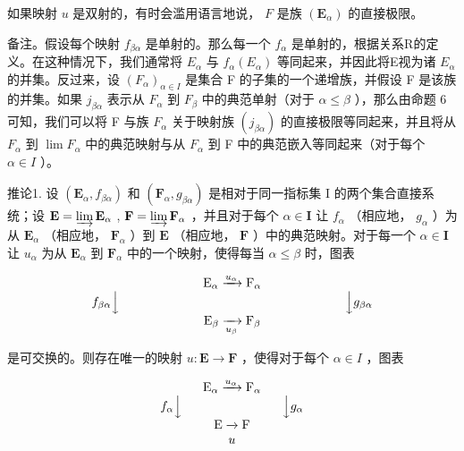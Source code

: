如果映射 \(u\) 是双射的，有时会滥用语言地说， \(F\) 是族 \((\mathbf{E}_{\alpha})\) 的直接极限。

备注。假设每个映射 \(f_{\beta \alpha}\) 是单射的。那么每一个 \(f_{\alpha}\) 是单射的，根据关系R的定义。在这种情况下，我们通常将 \(E_{\alpha}\) 与 \(f_{\alpha}(E_{\alpha})\) 等同起来，并因此将E视为诸 \(E_{\alpha}\) 的并集。反过来，设 \((F_{\alpha})_{\alpha \in I}\) 是集合 F 的子集的一个递增族，并假设 F 是该族的并集。如果 \(j_{\beta \alpha}\) 表示从 \(F_{\alpha}\) 到 \(F_{\beta}\) 中的典范单射（对于 \(\alpha \leqslant \beta\) ），那么由命题 6 可知，我们可以将 F 与族 \(F_{\alpha}\) 关于映射族 \((j_{\beta \alpha})\) 的直接极限等同起来，并且将从 \(F_{\alpha}\) 到 \(\lim F_{\alpha}\) 中的典范映射与从 \(F_{\alpha}\) 到 F 中的典范嵌入等同起来（对于每个 \(\alpha \in I\) ）。

推论1. 设 \((\mathbf{E}_{\alpha}, f_{\beta \alpha})\) 和 \((\mathbf{F}_{\alpha}, g_{\beta \alpha})\) 是相对于同一指标集 I 的两个集合直接系统；设 \(\mathbf{E} = \varinjlim \mathbf{E}_{\alpha}\) , \(\mathbf{F} = \varinjlim \mathbf{F}_{\alpha}\) ，并且对于每个 \(\alpha \in \mathbf{I}\) 让 \(f_{\alpha}\) （相应地， \(g_{\alpha}\) ）为从 \(\mathbf{E}_{\alpha}\) （相应地， \(\mathbf{F}_{\alpha}\) ）到 \(\mathbf{E}\) （相应地， \(\mathbf{F}\) ）中的典范映射。对于每一个 \(\alpha \in \mathbf{I}\) 让 \(u_{\alpha}\) 为从 \(\mathbf{E}_{\alpha}\) 到 \(\mathbf{F}_{\alpha}\) 中的一个映射，使得每当 \(\alpha \leqslant \beta\) 时，图表

\[
\begin{array}{c} \mathrm{E} _ {\alpha} \xrightarrow {u _ {\alpha}} \mathrm{F} _ {\alpha} \\ f _ {\beta \alpha} \Big \downarrow \qquad \qquad \qquad \qquad \qquad \qquad \qquad \qquad \qquad \Big \downarrow g _ {\beta \alpha} \\ \mathrm{E} _ {\beta} \xrightarrow [ u _ {\beta} ]{} \mathrm{F} _ {\beta} \end{array}
\]

是可交换的。则存在唯一的映射 \(u: \mathbf{E} \to \mathbf{F}\) ，使得对于每个 \(\alpha \in I\) ，图表

\[
\begin{array}{c} \mathrm{E} _ {\alpha} \xrightarrow {u _ {\alpha}} \mathrm{F} _ {\alpha} \\ f _ {\alpha} \Big \downarrow \qquad \qquad \qquad \qquad \Big \downarrow g _ {\alpha} \\ \mathrm{E} \xrightarrow {} \mathrm{F} \\ u \end{array}
\]

